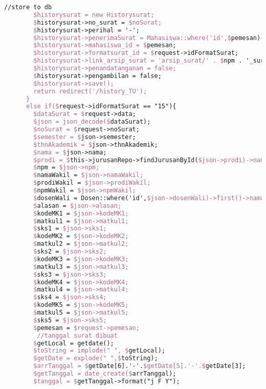 \begin{lstlisting}[language=tex,basicstyle=\tiny,caption=HistorysuratController.php]
        //store to db
        $historysurat = new Historysurat;
        $historysurat->no_surat = $noSurat;
        $historysurat->perihal = '-';
        $historysurat->penerimaSurat = Mahasiswa::where('id',$pemesan)->first()->dosen->nama_dosen;
        $historysurat->mahasiswa_id = $pemesan;
        $historysurat->formatsurat_id = $request->idFormatSurat;
        $historysurat->link_arsip_surat = 'arsip_surat/' . $npm . '_surat_perwakilan_perwalian_4mk.pdf';
        $historysurat->penandatanganan = false;
        $historysurat->pengambilan = false;
        $historysurat->save();
        return redirect('/history_TU');
      }
      else if($request->idFormatSurat == "15"){
        $dataSurat = $request->data;
        $json = json_decode($dataSurat);
        $noSurat = $request->noSurat;
        $semester = $json->semester;
        $thnAkademik = $json->thnAkademik;
        $nama = $json->nama;
        $prodi = $this->jurusanRepo->findJurusanById($json->prodi)->nama_jurusan;
        $npm = $json->npm;
        $namaWakil = $json->namaWakil;
        $prodiWakil = $json->prodiWakil;
        $npmWakil = $json->npmWakil;
        $dosenWali = Dosen::where('id',$json->dosenWali)->first()->nama_dosen;
        $alasan = $json->alasan;
        $kodeMK1 = $json->kodeMK1;
        $matkul1 = $json->matkul1;
        $sks1 = $json->sks1;
        $kodeMK2 = $json->kodeMK2;
        $matkul2 = $json->matkul2;
        $sks2 = $json->sks2;
        $kodeMK3 = $json->kodeMK3;
        $matkul3 = $json->matkul3;
        $sks3 = $json->sks3;
        $kodeMK4 = $json->kodeMK4;
        $matkul4 = $json->matkul4;
        $sks4 = $json->sks4;
        $kodeMK5 = $json->kodeMK5;
        $matkul5 = $json->matkul5;
        $sks5 = $json->sks5;
        $pemesan = $request->pemesan;
         //tanggal surat dibuat
        $getLocal = getdate();
        $toString = implode(" ", $getLocal);
        $getDate = explode(" ",$toString);
        $arrTanggal = $getDate[6].'-'.$getDate[5].'-'.$getDate[3];
        $getTanggal = date_create($arrTanggal);
        $tanggal = $getTanggal->format("j F Y");


\end{lstlisting}
